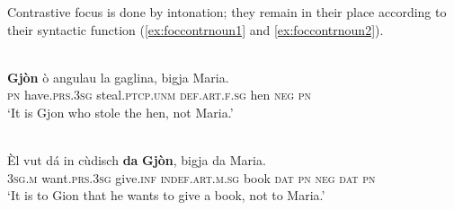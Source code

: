 Contrastive focus is done by intonation; they remain in their place according to their syntactic function (\ref{ex:foccontrnoun1} and \ref{ex:foccontrnoun2}).

\ea
\label{ex:foccontrnoun1}
\\
\gll \textbf{Gjòn} ò angulau la gaglina, bigja Maria.\\
\textsc{pn} have.\textsc{prs.3sg} steal.\textsc{ptcp.unm} \textsc{def.art.f.sg} hen \textsc{neg} \textsc{pn}\\
\glt `It is Gjon who stole the hen, not Maria.'
\z

\ea
\label{ex:foccontrnoun2}
\\
\gll Èl vut dá in cùdisch \textbf{da} \textbf{Gjòn}, bigja da Maria.\\
\textsc{3sg.m} want.\textsc{prs.3sg} give.\textsc{inf} \textsc{indef.art.m.sg} book \textsc{dat} \textsc{pn} \textsc{neg} \textsc{dat} \textsc{pn}\\
\glt `It is to Gion that he wants to give a book, not to Maria.'
\z







